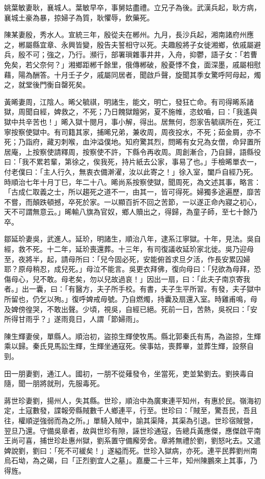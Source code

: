 \begin{pinyinscope}
姚葉敏妻耿，襄城人。葉敏早卒，事舅姑盡禮。立兄子為後。武漢兵起，耿方病，襄城土豪為暴，掠婦子為質，耿懼辱，飲藥死。

陳某妻殷，秀水人。宣統三年，殷從夫在郴州。九月，長沙兵起，湘南諸府州應之，郴屬縣宜章、永興皆變，殷告夫誓相守以死。夫趣殷將子女徙湘鄉，依戚屬避兵，殷不可；強之，乃行。瀕行，部署瑣雜事井井，入舟，抑鬱，語子女：「若曹免矣，若父奈何？」湘鄉距郴千餘里，俄傳郴破，殷憂悸不食，面深墨，戚屬相慰藉，陽為酬答。十月壬子夕，戚屬同居者，聞啟戶聲，旋聞其季女驚呼阿母起，燭之，就堂後門衡自罄死矣。

黃晞妻周，江陰人。晞父毓祺，明諸生，能文，明亡，發狂亡命。有司得晞系諸獄，周聞自經，婢救之，不死；乃日餽獄饘粥，夏不施帷，恣蚊嚙，曰：「我遙與獄中共辛苦也！」晞入獄十閱月，事小解，得出。居無何，怨家告毓祺所在，死江寧按察使獄中。有司籍其家，捕晞兄弟，兼收周，周夜投水，不死；茹金屑，亦不死；乃詣府，藏刃刺喉，血沖溢僕地。知府驚其烈，問晞有女兄為女僧，命舁置所居庵，上按察使請釋周，按察使不許，下縣令再收周。周創漸合，乃自歸，語縣役曰：「我不累若輩，第徐之，俟我死，持片紙去公家，事易了也。」手檢晞單衣一，付老僕曰：「主人行久，無衷衣備澣濯，汝以此寄之！」徐入室，闔戶自經乃死。時順治七年十月丁巳，年二十八。晞尚系按察使獄，聞周死，為文述其事，略言：「古成仁取義之士，所以趨死之道不一，由其一，皆可得死。婦獨多途遍歷，靡苦不嘗，而顛跌頓撼，卒死於家。一以顯百折不回之苦節，一以遂正命內寢之初心，天不可謂無意云。」晞輸八旗為官奴，鄉人贖出之，得歸，為童子師，至七十餘乃卒。

鄒延玠妻吳，武進人。延玠，明諸生，順治八年，逮系江寧獄。十年，見法。吳自經，救不死。十二年，延玠喪還葬。十三年，有司復議收延玠家北徙。吳乃迎母至，夜將半，起，請母所曰：「兒今固必死，安能俯首求旦夕活，作長安累囚婦耶？原母稍忍，成兒死。」母泣不能言。吳更衣拜佛，復向母曰：「兒欲為母拜，恐傷母心，兒不敢。母老矣，勿以兒故過哀！」因出一扇，曰：「此夫子南京寄我者。」出一囊，曰：「有醫方，夫子所手校。有書，夫子生平所習。有發，夫子獄中所留也，仍乞以殉。」復呼婢戒毋號。乃自燃燭，持囊及扇還入室。時雞甫鳴，母及婢傍徨哭，不敢出聲。少頃，視吳，自經已絕。死前一日，苦熱，吳祝曰：「安所得甘雨乎？」遂雨竟日，人謂「節婦雨」。

陳生輝妻侯，單縣人。順治初，盜掠生輝使牧馬。縣北郭秦氏有馬，為盜掠，生輝乘以歸。秦氏見馬訟生輝，生輝坐通寇死。侯事姑，喪葬畢，並葬生輝，設祭自剄。

田一朋妻劉，通江人。國初，一朋不從薙發令，坐當死，吏並縶劉去。劉挾毒自隨，聞一朋將就刑，先服毒死。

蔣世珍妻劉，揚州人，失其縣。世珍，順治中為廣東連平知州，有惠於民。嶺海初定，土寇數發，諜報旁縣賊數千人鄉連平，行至。世珍曰：「賊至，驚吾民，吾且往，權順逆強弱而為之所。」單騎入賊中，諭其渠降，其渠為引退。世珍宿賊營，翌旦乃還。守備吳章者，故與世珍有隙，誣世珍通寇，告總兵黃應傑，應傑啟平南王尚可喜，捕世珍赴惠州獄，劉系置守備廨旁舍。章將無禮於劉，劉怒叱去。又遣婢說劉，劉曰：「死不可緩矣！」遂縊而死。世珍入獄病，亦死。連平民葬劉州南烏石坳，為之碣，曰「正烈劉宜人之墓」。嘉慶二十三年，知州陳鵬來上其事，乃得旌。


\end{pinyinscope}

